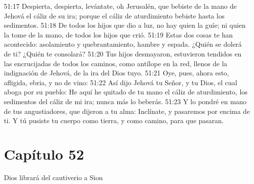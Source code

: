 51:17 Despierta, despierta, levántate, oh Jerusalén, que bebiste de la mano de Jehová el cáliz de su ira; porque el cáliz de aturdimiento bebiste hasta los sedimentos. 
51:18 De todos los hijos que dio a luz, no hay quien la guíe; ni quien la tome de la mano, de todos los hijos que crió. 
51:19 Estas dos cosas te han acontecido: asolamiento y quebrantamiento, hambre y espada. ¿Quién se dolerá de ti? ¿Quién te consolará? 
51:20 Tus hijos desmayaron, estuvieron tendidos en las encrucijadas de todos los caminos, como antílope en la red, llenos de la indignación de Jehová, de la ira del Dios tuyo. 
51:21 Oye, pues, ahora esto, afligida, ebria, y no de vino: 
51:22 Así dijo Jehová tu Señor, y tu Dios, el cual aboga por su pueblo: He aquí he quitado de tu mano el cáliz de aturdimiento, los sedimentos del cáliz de mi ira; nunca más lo beberás. 
51:23 Y lo pondré en mano de tus angustiadores, que dijeron a tu alma: Inclínate, y pasaremos por encima de ti. Y tú pusiste tu cuerpo como tierra, y como camino, para que pasaran. 
\section*{Capítulo 52 }
Dios librará del cautiverio a Sion 
 
